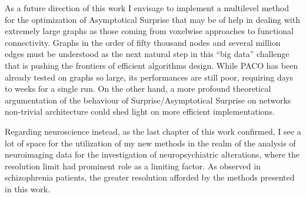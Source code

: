 As a future direction of this work I envisage to implement a multilevel method for the optimization of Asymptotical Surprise that may be of help in dealing with extremely large graphs as those coming from voxelwise approaches to functional connectivity.
Graphs in the order of fifty thousand nodes and several million edges must be understood as the next natural step in this ``big data'' challenge that is pushing the frontiers of efficient algorithms design. While PACO has been already tested on graphs so large, its performances are still poor, requiring days to weeks for a single run.
On the other hand, a more profound theoretical argumentation of the behaviour of Surprise/Asymptotical Surprise on networks non-trivial architecture could shed light on more efficient implementations.

Regarding neuroscience instead, as the last chapter of this work confirmed, I see a lot of space for the utilization of my new methods in the realm of the analysis of neuroimaging data for the investigation of neuropsychiatric alterations, where the resolution limit had prominent role as a limiting factor.
As observed in schizophrenia patients, the greater resolution afforded by the methods presented in this work.